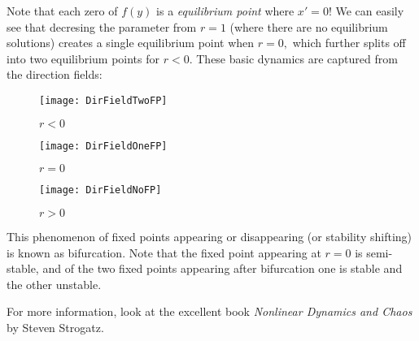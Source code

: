 \documentclass[10pt,a4paper]{article}
\begin{document}
\newpage

Note that each zero of $f(y)$ is a \emph{equilibrium point} where $x' = 0!$ We can easily see that decresing the parameter from $r = 1$ (where there are no equilibrium solutions) creates a single equilibrium point when $r = 0,$ which further splits off into two equilibrium points for $r < 0.$ These basic dynamics are captured from the direction fields:  


\begin{figure}[h]
\centering
\texttt{[image: DirFieldTwoFP]}
\caption{$r<0$}
\end{figure}

\begin{figure}[h]
\centering
\texttt{[image: DirFieldOneFP]}
\caption{$r = 0$}
\end{figure}
\begin{figure}[h!]
\centering
\texttt{[image: DirFieldNoFP]}
\caption{$r > 0$}
\end{figure}
 \newpage

This phenomenon of fixed points appearing or disappearing (or stability shifting) is known as bifurcation. Note that the fixed point appearing at $r = 0$ is semi-stable, and of the two fixed points appearing after bifurcation one is stable and the other unstable.

For more information, look at the excellent book \emph{Nonlinear Dynamics and Chaos} by Steven Strogatz.
\end{document}
